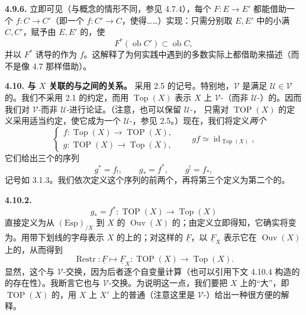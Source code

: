 \textbf{4.9.6.} 立即可见（与概念的情形不同，参见 4.7.4），每个 $F:E\to E'$ 都能借助一个 $f:C\to C'$（即一个 $f:C'\to C$，使得……）实现：只需分别取 $E,E'$ 中的小满 $C,C'$，赋予由 $E,E'$ 的，使
\[
 F^*(\operatorname{ob}C')\subset\operatorname{ob}C,
\]
并以 $F^*$ 诱导的作为 $f$。这解释了为何实践中遇到的多数实际上都借助来描述（而不是像 4.7 那样借助）。

\textbf{4.10. 与 $X$ 关联的与之间的关系。} 采用 2.5 的记号。特别地，$\mathcal V$ 是满足 $\mathcal U\in\mathcal V$ 的。我们不采用 2.1 的约定，而用 $\operatorname{Top}(X)$ 表示 $X$ 上 $\mathcal V$-（而非 $\mathcal U$-）的。因而我们对 $\mathcal V$-而非 $\mathcal U$-进行论证。（注意，也可以保留 $\mathcal U$-，
只需对 $\operatorname{TOP}(X)$ 的定义采用适当约定，使它成为一个 $\mathcal U$-，参见 2.5。）现在，我们将定义\emph{两个}
\[
 \begin{cases}
 f:\operatorname{Top}(X)\longrightarrow\operatorname{TOP}(X),\\
 g:\operatorname{TOP}(X)\longrightarrow\operatorname{Top}(X),
 \end{cases}
 \qquad gf\simeq\operatorname{id}_{\operatorname{Top}(X)},\tag{4.10.1}
\]
它们给出三个的序列
\[
 g^*=f_!,\qquad g_*=f^*,\qquad g^!=f_*,\tag{4.10.1.1}
\]
记号如 3.1.3。我们依次定义这个序列的前两个，再将第三个定义为第二个的。

\textbf{4.10.2.} 
\[
 g_*=f^*:\operatorname{TOP}(X)\longrightarrow\operatorname{Top}(X)
\]
直接定义为从 $(\mathrm{Esp})_{/X}$ 到 $X$ 的 $\operatorname{Ouv}(X)$ 的；由定义立即得知，它确实将变为。用带下划线的字母表示 $X$ 的上的；对这样的 $\underline F$，以 $\underline F_X$ 表示它在 $\operatorname{Ouv}(X)$ 上的，从而得到
\[
 \operatorname{Restr}:\underline F\longmapsto\underline F_X:\operatorname{TOP}(X)\longrightarrow\operatorname{Top}(X).\tag{4.10.2.1}
\]
显然，这个与 $\mathcal V$-交换，因为后者逐个自变量计算（也可以引用下文 4.10.4 构造的的存在性）。我断言它也与 $\mathcal V$-交换。为说明这一点，我们要把 $X$ 上的“大”，即 $\operatorname{TOP}(X)$ 的，用 $X$ 上 $X'$ 上的普通（注意这里是 $\mathcal V$-）给出一种很方便的解释。

